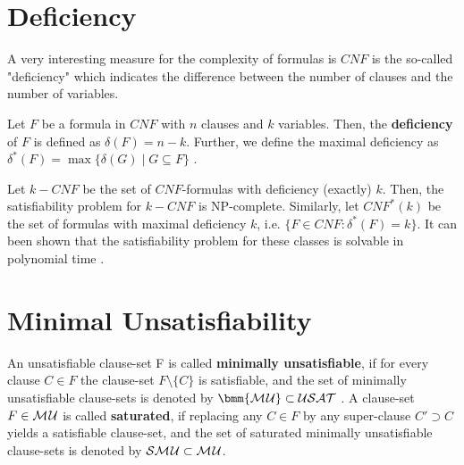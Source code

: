\documentclass[12pt]{book}
\begin{document}
\begin{examp}
\begin{examp}
\begin{examp}
{\section{Deficiency}
\label{sec:Deficiency}

A very interesting measure for the complexity of formulas is $CNF$ is the so-called "deficiency" which indicates the difference 
between the number of clauses and the number of variables.
\begin{defi}\label{def:df1}
      Let $F$ be a formula in $CNF$ with $n$ clauses and $k$ variables. Then, the \textbf{deficiency} of $F$ is defined as $\delta (F) = n - k$. 
	  Further, we define the maximal deficiency as $\delta ^*(F) = \max \{ \delta (G) \mid G \subseteq F \}$ \cite{h6}.
\end{defi} 
Let $k-CNF$ be the set of $CNF$-formulas with deficiency (exactly) $k$. Then, the satisfiability problem for $k-CNF$ is NP-complete. 
Similarly, let $CNF ^* (k)$ be the set of formulas with maximal deficiency $k$, i.e. 
$\{F \in CNF : \delta ^*(F) = k \}$. It can been shown that the satisfiability problem for these classes is solvable in polynomial time \cite{h6}.

\section{Minimal Unsatisfiability}
\label{sec:minsat}

\begin{defi}\label{def:minsat1}
      An unsatisfiable clause-set F is called \textbf{minimally unsatisfiable}, if for every clause $C \in F$ the clause-set $F \setminus \{C\}$ 
	  is satisfiable, and the set of minimally unsatisfiable clause-sets is denoted by $\bmm{\Musat} \subset \Usat$ . A clause-set $F \in \mathcal{M\hspace{0.8pt}U}$ is called
	  \textbf{saturated}, if replacing any $C \in F$ by any super-clause $C' \supset C$ yields a satisfiable clause-set, and the set of saturated 
	  minimally unsatisfiable clause-sets is denoted by $\mathcal{S}\mathcal{M\hspace{0.8pt}U} \subset \mathcal{M\hspace{0.8pt}U}$.
\end{defi}


}
\end{examp}
\end{examp}
\end{examp}
\end{document}
